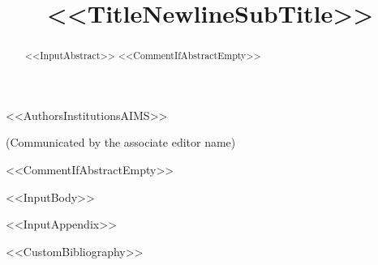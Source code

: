 \documentclass[%
<<DocumentClassOptions>>]{aims}
\title[<<ShortTitle>>]{<<TitleNewlineSubTitle>>}
\author[<<AuthorsRunningHeadAIMS>>]{}
\begin{document}
\maketitle

<<AuthorsInstitutionsAIMS>>

\bigskip

\centerline{(Communicated by the associate editor name)}

<<CommentIfAbstractEmpty>>\begin{abstract}
<<InputAbstract>>
<<CommentIfAbstractEmpty>>\end{abstract}

<<InputBody>>

\appendix
<<InputAppendix>>


<<CustomBibliography>>
\end{document}
